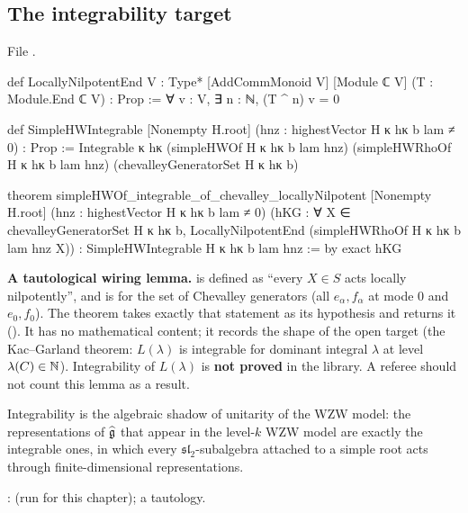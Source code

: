 \subsection{The integrability target}

File .
\begin{leancode}
def LocallyNilpotentEnd {V : Type*} [AddCommMonoid V] [Module ℂ V]
    (T : Module.End ℂ V) : Prop :=
  ∀ v : V, ∃ n : ℕ, (T ^ n) v = 0

def SimpleHWIntegrable [Nonempty H.root] (hnz : highestVector H κ hκ b lam ≠ 0) : Prop :=
  Integrable κ hκ (simpleHWOf H κ hκ b lam hnz) (simpleHWRhoOf H κ hκ b lam hnz)
    (chevalleyGeneratorSet H κ hκ b)

theorem simpleHWOf_integrable_of_chevalley_locallyNilpotent [Nonempty H.root]
    (hnz : highestVector H κ hκ b lam ≠ 0)
    (hKG : ∀ X ∈ chevalleyGeneratorSet H κ hκ b,
      LocallyNilpotentEnd (simpleHWRhoOf H κ hκ b lam hnz X)) :
    SimpleHWIntegrable H κ hκ b lam hnz := by
  exact hKG
\end{leancode}

\begin{warning}
\textbf{A tautological wiring lemma.}  is defined as ``every $X\in S$ acts locally
nilpotently'', and \allowbreak{} is  for the set of Chevalley generators
(all $e_\alpha,f_\alpha$ at mode $0$ and $e_0,f_0$). The theorem
\allowbreak{}\allowbreak{}\allowbreak{}\allowbreak{} takes exactly that statement as its
hypothesis  and returns it (). It has no mathematical content; it records the
shape of the open target (the Kac--Garland theorem: $L(\lambda)$ is integrable for dominant integral
$\lambda$ at level $\lambda(C)\in{\mathbb{N}}$). Integrability of $L(\lambda)$ is \textbf{not proved} in the library. A
referee should not count this lemma as a result.
\end{warning}

\begin{physics}
Integrability is the algebraic shadow of unitarity of the WZW model: the representations of
$\widehat{\mathfrak{g}}$ that appear in the level-$k$ WZW model are exactly the integrable ones, in which every
$\mathfrak{sl}_2$-subalgebra attached to a simple root acts through finite-dimensional representations.
\end{physics}

\begin{status}
\allowbreak{}\allowbreak{}\allowbreak{}\allowbreak{}\allowbreak{}\allowbreak{}:
 (run for this chapter); a tautology.
\end{status}

